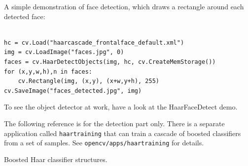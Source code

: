 \ifPy
A simple demonstration of face detection, which draws a rectangle around each detected face:

\begin{lstlisting}

hc = cv.Load("haarcascade_frontalface_default.xml")
img = cv.LoadImage("faces.jpg", 0)
faces = cv.HaarDetectObjects(img, hc, cv.CreateMemStorage())
for (x,y,w,h),n in faces:
    cv.Rectangle(img, (x,y), (x+w,y+h), 255)
cv.SaveImage("faces_detected.jpg", img)

\end{lstlisting}

\fi

\ifC
To see the object detector at work, have a look at the HaarFaceDetect demo.

The following reference is for the detection part only. There
is a separate application called \texttt{haartraining} that can
train a cascade of boosted classifiers from a set of samples. See
\texttt{opencv/apps/haartraining} for details.

\label{CvHaarFeature}
\label{CvHaarClassifier}
\label{CvHaarStageClassifier}
\label{CvHaarClassifierCascade}

Boosted Haar classifier structures.

